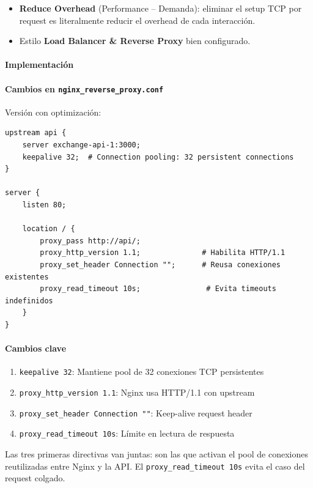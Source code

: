 \begin{itemize}[leftmargin=*]
    \item \textbf{Reduce Overhead} (Performance -- Demanda): eliminar el setup TCP por request es literalmente reducir el overhead de cada interacción.
    \item Estilo \textbf{Load Balancer \& Reverse Proxy} bien configurado.
\end{itemize}

\paragraph{Implementación}

\paragraph{Cambios en \texttt{nginx\_reverse\_proxy.conf}} Versión con optimización:

\begin{verbatim}
upstream api {
    server exchange-api-1:3000;
    keepalive 32;  # Connection pooling: 32 persistent connections
}

server {
    listen 80;

    location / {
        proxy_pass http://api/;
        proxy_http_version 1.1;              # Habilita HTTP/1.1
        proxy_set_header Connection "";      # Reusa conexiones existentes
        proxy_read_timeout 10s;               # Evita timeouts indefinidos
    }
}
\end{verbatim}

\paragraph{Cambios clave}
\begin{enumerate}[leftmargin=*]
    \item \texttt{keepalive 32}: Mantiene pool de 32 conexiones TCP persistentes
    \item \texttt{proxy\_http\_version 1.1}: Nginx usa HTTP/1.1 con upstream
    \item \texttt{proxy\_set\_header Connection ""}: Keep-alive request header
    \item \texttt{proxy\_read\_timeout 10s}: Límite en lectura de respuesta
\end{enumerate}

Las tres primeras directivas van juntas: son las que activan el pool de conexiones reutilizadas entre Nginx y la API. El \texttt{proxy\_read\_timeout 10s} evita el caso del request colgado.

